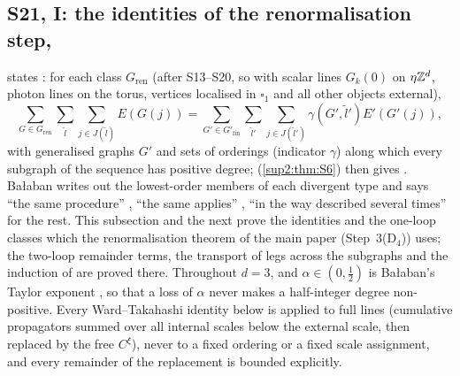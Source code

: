 
\subsection{S21, I: the identities of the renormalisation step, \cite[pp.~434--445]{Ba3}}\label{sup4:ssec:S21a}

\cite[p.~434]{Ba3} states \cite[(3.5)]{Ba3}: for each class $G_{\mathrm{ren}}$ (after S13--S20, so with scalar lines $G_k(0)$ on $\eta\mathbb Z^d$, photon lines on the torus, vertices localised in $\square_1$ and all other objects external),
\[
\sum_{G\in G_{\mathrm{ren}}}\sum_{\tilde l}\sum_{j\in J(\tilde l)}E(G(j))=\sum_{G'\in G'_{\mathrm{fin}}}\sum_{\tilde l'}\sum_{j\in J(\tilde l')}\gamma(G',\tilde l')E'(G'(j)),
\]
with generalised graphs $G'$ and sets of orderings (indicator $\gamma$) along which every subgraph of the sequence has positive degree; \cite[Prop.~2.2]{Ba3} (\cref{sup2:thm:S6}) then gives \cite[(3.3)]{Ba3}. Ba{\l}aban writes out the lowest-order members of each divergent type and says ``the same procedure'' \cite[p.~438]{Ba3}, ``the same applies'' \cite[p.~437]{Ba3}, ``in the way described several times'' \cite[p.~444]{Ba3} for the rest. This subsection and the next prove the identities and the one-loop classes which the renormalisation theorem of the main paper (Step~3(D$_4$)) uses; the two-loop remainder terms, the transport of legs across the subgraphs \cite[(2.4)]{Ba3} and the induction of \cite[pp.~444--445]{Ba3} are proved there. Throughout $d=3$, and $\alpha\in(0,\frac12)$ is Ba{\l}aban's Taylor exponent \cite[p.~435]{Ba3}, so that a loss of $\alpha$ never makes a half-integer degree non-positive. Every Ward--Takahashi identity below is applied to full lines (cumulative propagators summed over all internal scales below the external scale, then replaced by the free $C^\xi$), never to a fixed ordering or a fixed scale assignment, and every remainder of the replacement is bounded explicitly.

